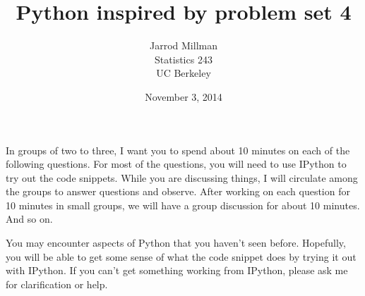 \documentclass{article}
\title{Python inspired by problem set 4}
\date{November 3, 2014}
\author{Jarrod Millman\\ Statistics 243\\ UC Berkeley}
\begin{document}
\maketitle

In groups of two to three, I want you to spend about 10 minutes on each of the
following questions.  For most of the questions, you will need to use IPython
to try out the code snippets.  While you are discussing things, I will
circulate among the groups to answer questions and observe.  After working on
each question for 10 minutes in small groups, we will have a group discussion
for about 10 minutes.  And so on.

You may encounter aspects of Python that you haven't seen before.  Hopefully,
you will be able to get some sense of what the code snippet does by trying it
out with IPython.  If you can't get something working from IPython, please ask
me for clarification or help.
\end{document}
